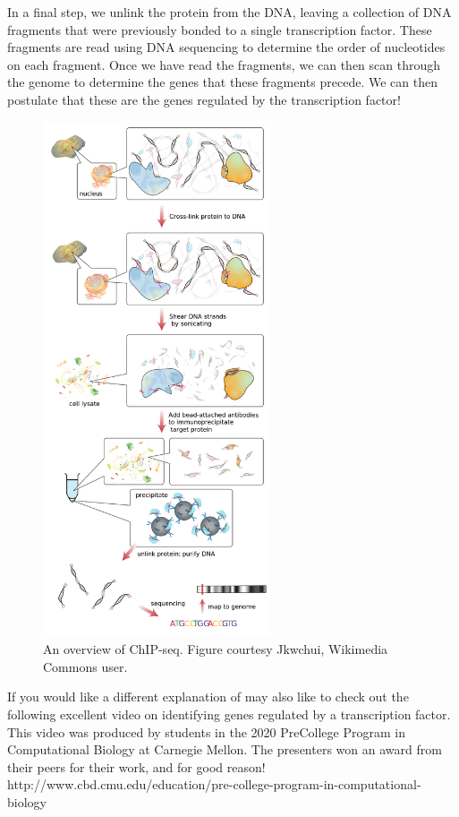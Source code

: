 In a final step, we unlink the protein from the DNA, leaving a collection of DNA fragments that were previously bonded to a single transcription factor. These fragments are read using DNA sequencing to determine the order of nucleotides on each fragment. Once we have read the fragments, we can then scan through the genome to determine the genes that these fragments precede. We can then postulate that these are the genes regulated by the transcription factor!

\begin{figure}[h]
\centering
\mySfFamily
\includegraphics[width = 0.6\textwidth]{../images/ChIP-seq_workflow.png}
\caption{An overview of ChIP-seq. Figure courtesy Jkwchui, Wikimedia Commons user.}
\label{fig:ChIP-seq_workflow}
\end{figure}

If you would like a different explanation of  may also like to check out the following excellent video on identifying genes regulated by a transcription factor. This video was produced by students in the 2020 PreCollege Program in Computational Biology at Carnegie Mellon. The presenters won an award from their peers for their work, and for good reason! http://www.cbd.cmu.edu/education/pre-college-program-in-computational-biology

